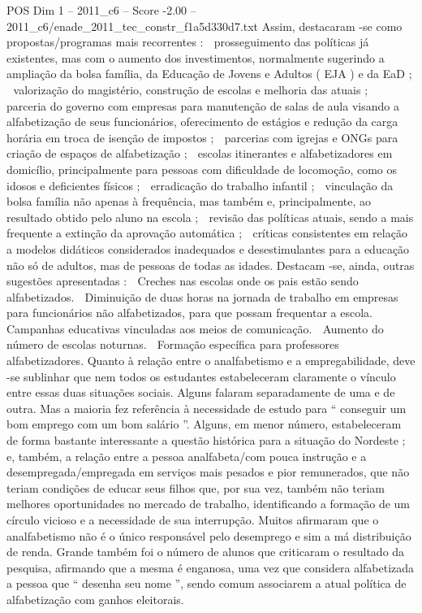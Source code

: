 \begin{textsample}{POS Dim 1 – 2011\_c6 – Score -2.00 – 2011\_c6/enade\_2011\_tec\_constr\_f1a5d330d7.txt}
Assim, destacaram -se como propostas/programas mais recorrentes :  prosseguimento das políticas já existentes, mas com o aumento dos investimentos, normalmente sugerindo a ampliação da bolsa família, da Educação de Jovens e Adultos ( EJA ) e da EaD ;  valorização do magistério, construção de escolas e melhoria das atuais ;  parceria do governo com empresas para manutenção de salas de aula visando a alfabetização de seus funcionários, oferecimento de estágios e redução da carga horária em troca de isenção de impostos ;  parcerias com igrejas e ONGs para criação de espaços de alfabetização ;  escolas itinerantes e alfabetizadores em domicílio, principalmente para pessoas com dificuldade de locomoção, como os idosos e deficientes físicos ;  erradicação do trabalho infantil ;  vinculação da bolsa família não apenas à frequência, mas também e, principalmente, ao resultado obtido pelo aluno na escola ;  revisão das políticas atuais, sendo a mais frequente a extinção da aprovação automática ;  críticas consistentes em relação a modelos didáticos considerados inadequados e desestimulantes para a educação não só de adultos, mas de pessoas de todas as idades.
Destacam -se, ainda, outras sugestões apresentadas :  Creches nas escolas onde os pais estão sendo alfabetizados.  Diminuição de duas horas na jornada de trabalho em empresas para funcionários não alfabetizados, para que possam frequentar a escola.  Campanhas educativas vinculadas aos meios de comunicação.  Aumento do número de escolas noturnas.  Formação específica para professores alfabetizadores.
Quanto à relação entre o analfabetismo e a empregabilidade, deve -se sublinhar que nem todos os estudantes estabeleceram claramente o vínculo entre essas duas situações sociais.
Alguns falaram separadamente de uma e de outra.
Mas a maioria fez referência à necessidade de estudo para “ conseguir um bom emprego com um bom salário ”.
Alguns, em menor número, estabeleceram de forma bastante interessante a questão histórica para a situação do Nordeste ; e, também, a relação entre a pessoa analfabeta/com pouca instrução e a desempregada/empregada em serviços mais pesados e pior remunerados, que não teriam condições de educar seus filhos que, por sua vez, também não teriam melhores oportunidades no mercado de trabalho, identificando a formação de um círculo vicioso e a necessidade de sua interrupção.
Muitos afirmaram que o analfabetismo não é o único responsável pelo desemprego e sim a má distribuição de renda.
Grande também foi o número de alunos que criticaram o resultado da pesquisa, afirmando que a mesma é enganosa, uma vez que considera alfabetizada a pessoa que “ desenha seu nome ”, sendo comum associarem a atual política de alfabetização com ganhos eleitorais.

\end{textsample}
